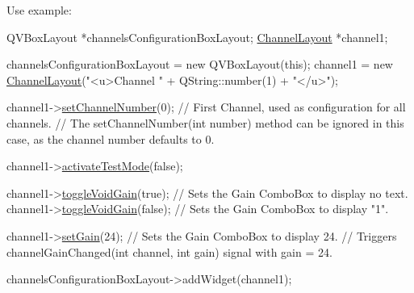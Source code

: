 Use example\+: 
\begin{DoxyCode}
QVBoxLayout *channelsConfigurationBoxLayout;
\hyperlink{classChannelLayout}{ChannelLayout} *channel1;

channelsConfigurationBoxLayout = \textcolor{keyword}{new} QVBoxLayout(\textcolor{keyword}{this});
channel1 = \textcolor{keyword}{new} \hyperlink{classChannelLayout_a36135c95c4635b8e2b426b8968dc4847}{ChannelLayout}(\textcolor{stringliteral}{"<u>Channel "} + QString::number(1) + \textcolor{stringliteral}{"</u>"});

channel1->\hyperlink{classChannelLayout_a8af1129c9668ad666f3f8b5884bc2e26}{setChannelNumber}(0);                  \textcolor{comment}{// First Channel, used as configuration for
       all channels.}
                                                \textcolor{comment}{// The setChannelNumber(int number) method can be ignored
       in this case, as the channel number defaults to 0.}

channel1->\hyperlink{classChannelLayout_a2fc7025ace239041152a6b7f01141e55}{activateTestMode}(\textcolor{keyword}{false});

channel1->\hyperlink{classChannelLayout_a3417dcaf9e7632b9b5c1c77d0dcf8d73}{toggleVoidGain}(\textcolor{keyword}{true});                 \textcolor{comment}{// Sets the Gain ComboBox to display no text.}
channel1->\hyperlink{classChannelLayout_a3417dcaf9e7632b9b5c1c77d0dcf8d73}{toggleVoidGain}(\textcolor{keyword}{false});                \textcolor{comment}{// Sets the Gain ComboBox to display "1".}

channel1->\hyperlink{classChannelLayout_a79f01917e46190d8e7e1cfaeb66b5334}{setGain}(24);                          \textcolor{comment}{// Sets the Gain ComboBox to display 24.}
                                                \textcolor{comment}{// Triggers channelGainChanged(int channel, int gain)
       signal with gain = 24.}

channelsConfigurationBoxLayout->addWidget(channel1);
\end{DoxyCode}



